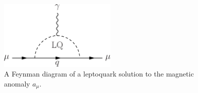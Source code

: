 \begin{figure}[H]
    \centering
    \includegraphics[width=0.5\textwidth]{Images/Muon_gminus2_LQ.pdf}
    \caption{A Feynman diagram of a leptoquark solution to the magnetic anomaly $a_{\mu}$.}
    \label{fig:amuLQ}
\end{figure}